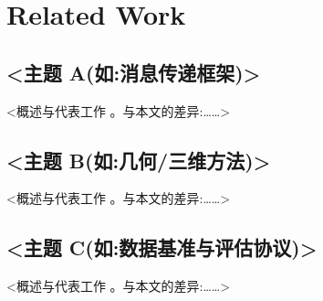 \section{Related Work}\label{sec:related}

\subsection{<主题 A(如:消息传递框架)>}
<概述与代表工作 \cite{...}。与本文的差异:……>

\subsection{<主题 B(如:几何/三维方法)>}
<概述与代表工作 \cite{...}。与本文的差异:……>

\subsection{<主题 C(如:数据基准与评估协议)>}
<概述与代表工作 \cite{...}。与本文的差异:……>
